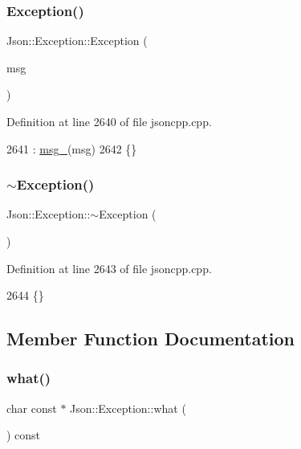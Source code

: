 \subsubsection{\texorpdfstring{Exception()}{Exception()}}
{\footnotesize\ttfamily Json\+::\+Exception\+::\+Exception (\begin{DoxyParamCaption}\item[{\hyperlink{json_8h_a1e723f95759de062585bc4a8fd3fa4be}{J\+S\+O\+N\+C\+P\+P\+\_\+\+S\+T\+R\+I\+NG} const \&}]{msg }\end{DoxyParamCaption})}



Definition at line 2640 of file jsoncpp.\+cpp.


\begin{DoxyCode}
2641   : \hyperlink{class_json_1_1_exception_aae3cbb8b45bf21480f64502a8329659f}{msg\_}(msg)
2642 \{\}
\end{DoxyCode}
\mbox{\label{class_json_1_1_exception_add6af5e0ecdf36f40d7f3554b9786e21}} 
\subsubsection{\texorpdfstring{$\sim$\+Exception()}{~Exception()}}
{\footnotesize\ttfamily Json\+::\+Exception\+::$\sim$\+Exception (\begin{DoxyParamCaption}{ }\end{DoxyParamCaption})}



Definition at line 2643 of file jsoncpp.\+cpp.


\begin{DoxyCode}
2644 \{\}
\end{DoxyCode}


\subsection{Member Function Documentation}
\mbox{\label{class_json_1_1_exception_a70b7ce35e761fb93e8cd338e04619cd6}} 
\subsubsection{\texorpdfstring{what()}{what()}}
{\footnotesize\ttfamily char const  $\ast$ Json\+::\+Exception\+::what (\begin{DoxyParamCaption}{ }\end{DoxyParamCaption}) const}



